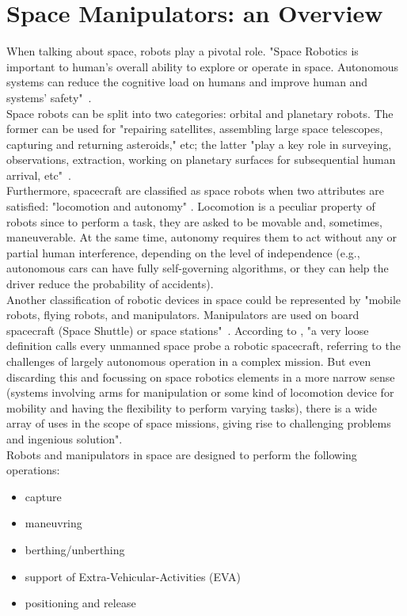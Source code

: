 \documentclass[a4paper,12pt,oneside]{report}
\begin{document}
\chapter{Space Manipulators: an Overview}\label{overview}
\pagestyle{stylenor}
When talking about space, robots play a pivotal role. "Space Robotics is important to human's overall ability to explore or operate in space. Autonomous systems can reduce the cognitive load on humans and improve human and systems' safety"~\cite{three}.\\
Space robots can be split into two categories: orbital and planetary robots. The former can be used for "repairing satellites, assembling large space telescopes, capturing and returning asteroids," etc; the latter "play a key role in surveying, observations, extraction, working on planetary surfaces for subsequential human arrival, etc"~\cite{three}.\\
Furthermore, spacecraft are classified as space robots when two attributes are satisfied: "locomotion and autonomy" \cite{three}. Locomotion is a peculiar property of robots since to perform a task, they are asked to be movable and, sometimes, maneuverable. At the same time, autonomy requires them to act without any or partial human interference, depending on the level of independence (e.g., autonomous cars can have fully self-governing algorithms, or they can help the driver reduce the probability of accidents). \\
Another classification of robotic devices in space could be represented by "mobile robots, flying robots, and manipulators. Manipulators are used on board spacecraft (Space Shuttle) or space stations"~\cite{five}.
According to \cite{one}, "a very loose definition calls every unmanned space probe a robotic spacecraft, referring to the challenges of largely autonomous operation in a complex mission. But even discarding this and focussing on space robotics elements in a more narrow sense (systems involving arms for manipulation or some kind of locomotion device for mobility and having the flexibility to perform varying tasks), there is a wide array of uses in the scope of space missions, giving rise to challenging problems and ingenious solution".\\
Robots and manipulators in space are designed to perform the following operations:
\begin{itemize}
\item capture
\item maneuvring
\item berthing/unberthing
\item support of Extra-Vehicular-Activities (EVA)
\item positioning and release
\end{itemize}
\end{document}
